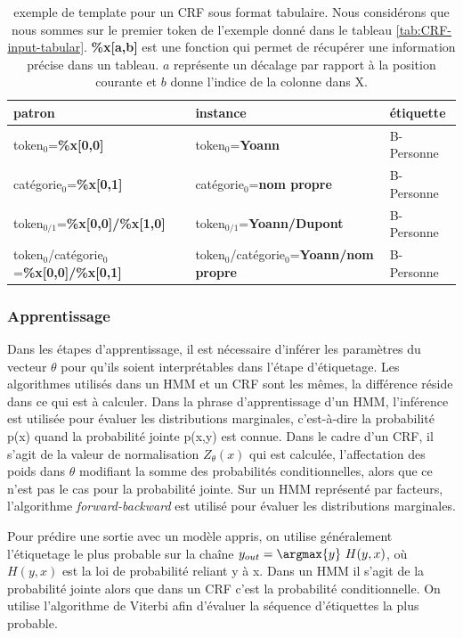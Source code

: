 \documentclass[12pt,a4paper,times,twoside,openright]{report}
\begin{document}
\begin{table}[ht!]
\centering
\small
\begin{tabular}{|l|l|l|}
\hline
patron & instance & étiquette\\
\hline
token$_{0}$=\textbf{\%x[0,0]} & token$_{0}$=\textbf{Yoann} & B-Personne \\
catégorie$_{0}$=\textbf{\%x[0,1]} & catégorie$_{0}$=\textbf{nom propre} & B-Personne \\
token$_{0/1}$=\textbf{\%x[0,0]/\%x[1,0]} & token$_{0/1}$=\textbf{Yoann/Dupont} & B-Personne \\
token$_{0}$/catégorie$_{0}$=\textbf{\%x[0,0]/\%x[0,1]} & token$_{0}$/catégorie$_{0}$=\textbf{Yoann/nom propre} & B-Personne \\
\hline
\end{tabular}
\caption{exemple de template pour un CRF sous format tabulaire. Nous considérons que nous sommes sur le premier token de l'exemple donné dans le tableau \ref{tab:CRF-input-tabular}. \textbf{\%x[a,b]} est une fonction qui permet de récupérer une information précise dans un tableau. $a$ représente un décalage par rapport à la position courante et $b$ donne l'indice de la colonne dans X.}
\label{tab:crf-template}
\end{table}


        
            \subsubsection{Apprentissage}
            \label{subsubsec:CRFs-training}
Dans les étapes d'apprentissage, il est nécessaire d'inférer les paramètres du vecteur $\theta$ pour qu'ils soient interprétables dans l'étape d'étiquetage. Les algorithmes utilisés dans un HMM et un CRF sont les mêmes, la différence réside dans ce qui est à calculer.
Dans la phrase d'apprentissage d'un HMM, l'inférence est utilisée pour évaluer les distributions marginales, c'est-à-dire la probabilité p(x) quand la probabilité jointe p(x,y) est connue. Dans le cadre d'un CRF, il s'agit de la valeur de normalisation $Z_{\theta}(x)$ qui est calculée, l'affectation des poids dans $\theta$ modifiant la somme des probabilités conditionnelles, alors que ce n'est pas le cas pour la probabilité jointe. Sur un HMM représenté par facteurs, l'algorithme \emph{forward-backward} \citep{baum1972equality,rabiner1986introduction} est utilisé pour évaluer les distributions marginales.

Pour prédire une sortie avec un modèle appris, on utilise généralement l'étiquetage le plus probable sur la chaîne $y_{out} = \argmax{y}\ H(y, x)$, où $H(y, x)$ est la loi de probabilité reliant y à x. Dans un HMM il s'agit de la probabilité jointe alors que dans un CRF c'est la probabilité conditionnelle. On utilise l'algorithme de Viterbi \citep{viterbi1967error,rabiner1986introduction} afin d'évaluer la séquence d'étiquettes la plus probable.
\end{document}
